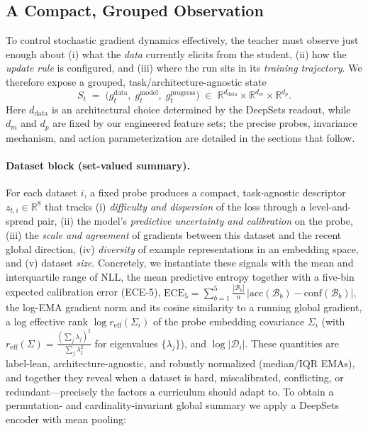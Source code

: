 \documentclass[11pt]{article}
\newcommand{\R}{\mathbb{R}}
\newcommand{\1}{\mathbf{1}}
\begin{document}
\subsection{A Compact, Grouped Observation}\label{sec:state}
To control stochastic gradient dynamics effectively, the teacher must observe just enough about (i) what the \emph{data} currently elicits from the student, (ii) how the \emph{update rule} is configured, and (iii) where the run sits in its \emph{training trajectory}. We therefore expose a grouped, task/architecture-agnostic state
\begin{equation}
\label{eq:grouped-state}
S_t \;=\; \big( g^{\text{data}}_t,\; g^{\text{model}}_t,\; g^{\text{progress}}_t \big)
\;\in\; \R^{d_{\text{data}}}\times\R^{d_m}\times\R^{d_p}.
\end{equation}
Here $d_{\text{data}}$ is an architectural choice determined by the DeepSets readout, while $d_m$ and $d_p$ are fixed by our engineered feature sets; the precise probes, invariance mechanism, and action parameterization are detailed in the sections that follow.

\paragraph{Dataset block (set-valued summary).}
For each dataset $i$, a fixed probe produces a compact, task-agnostic descriptor $z_{t,i}\in\R^{8}$ that tracks (i) \emph{difficulty and dispersion} of the loss through a level-and-spread pair, (ii) the model’s \emph{predictive uncertainty and calibration} on the probe, (iii) the \emph{scale and agreement} of gradients between this dataset and the recent global direction, (iv) \emph{diversity} of example representations in an embedding space, and (v) dataset \emph{size}. Concretely, we instantiate these signals with the mean and interquartile range of NLL, the mean predictive entropy together with a five-bin expected calibration error (ECE-5),
\(
\mathrm{ECE}_5=\sum_{b=1}^5 \tfrac{|\mathcal{B}_b|}{n}\,|\mathrm{acc}(\mathcal{B}_b)-\mathrm{conf}(\mathcal{B}_b)|,
\)
the log-EMA gradient norm and its cosine similarity to a running global gradient, a log effective rank $ \log r_{\mathrm{eff}}(\Sigma_i)$ of the probe embedding covariance $\Sigma_i$ (with $r_{\mathrm{eff}}(\Sigma)=\frac{(\sum_j \lambda_j)^2}{\sum_j \lambda_j^2}$ for eigenvalues $\{\lambda_j\}$), and $\log|\mathcal{D}_i|$. These quantities are label-lean, architecture-agnostic, and robustly normalized (median/IQR EMAs), and together they reveal when a dataset is hard, miscalibrated, conflicting, or redundant—precisely the factors a curriculum should adapt to. To obtain a permutation- and cardinality-invariant global summary we apply a DeepSets encoder with mean pooling:
\end{document}
